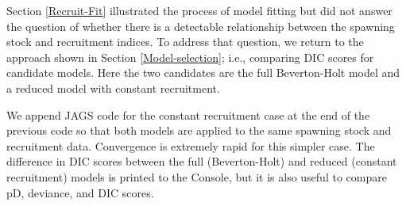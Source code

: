 \documentclass[
]{krantz}
\begin{document}
Section \ref{Recruit-Fit} illustrated the process of model fitting but did not answer the question of whether there is a detectable relationship between the spawning stock and recruitment indices. To address that question, we return to the approach shown in Section \ref{Model-selection}; i.e., comparing DIC scores for candidate models. Here the two candidates are the full Beverton-Holt model and a reduced model with constant recruitment.

We append JAGS code for the constant recruitment case at the end of the previous code so that both models are applied to the same spawning stock and recruitment data. Convergence is extremely rapid for this simpler case. The difference in DIC scores between the full (Beverton-Holt) and reduced (constant recruitment) models is printed to the Console, but it is also useful to compare pD, deviance, and DIC scores.
\end{document}
